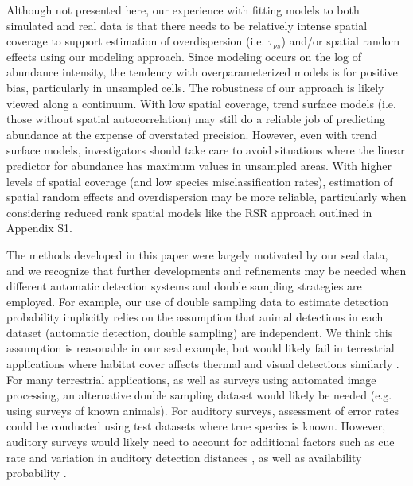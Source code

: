 \documentclass[12pt,fleqn]{article}
\begin{document}
\begin{flushleft}
\hspace{.5in}Although not presented here, our experience with fitting models to both simulated and real data is that there needs to be relatively intense spatial coverage to support estimation of overdispersion (i.e. $\tau_{\nu s}$) and/or spatial random effects using our modeling approach.  Since modeling occurs on the log of abundance intensity, the tendency with overparameterized models is for positive bias, particularly in unsampled cells.  The robustness of our approach is likely viewed along a continuum.  With low spatial coverage, trend surface models (i.e. those without spatial autocorrelation) may still do a reliable job of predicting abundance at the expense of overstated precision.  However, even with trend surface models, investigators should take care to avoid situations where the linear predictor for abundance has maximum values in unsampled areas.  With higher levels of spatial coverage (and low species misclassification rates), estimation of spatial random effects and overdispersion may be more reliable, particularly when considering reduced rank spatial models like the RSR approach outlined in Appendix S1.

\hspace{.5in} The methods developed in this paper were largely motivated by our seal data, and we recognize that further developments and refinements may be needed when different automatic detection systems and double sampling strategies are employed.  For example, our use of double sampling data to estimate detection probability implicitly relies on the assumption that animal detections in each dataset (automatic detection, double sampling) are independent.  We think this assumption is reasonable in our seal example, but would likely fail in terrestrial applications where habitat cover affects thermal and visual detections similarly \citep{FrankeEtAl2012}. For many terrestrial applications, as well as surveys using automated image processing, an alternative double sampling dataset would likely be needed (e.g. using surveys of known animals).  For auditory surveys, assessment of error rates could be conducted using test datasets where true species is known.  However, auditory surveys would likely need to account for additional factors such as cue rate and variation in auditory detection distances \citep{MarquesEtAl2013}, as well as availability probability \citep{DiefenbachEtAl2007}.


\end{flushleft}
\end{document}
